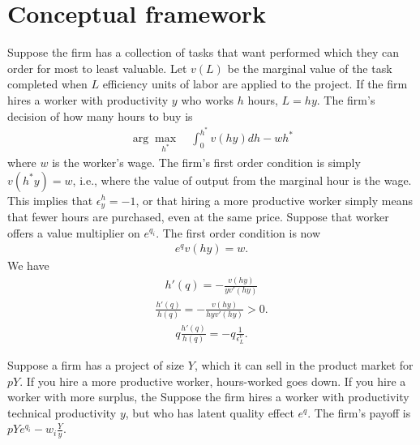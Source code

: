 \section{Conceptual framework} \label{sec:cf}

Suppose the firm has a collection of tasks that want performed which they can order for most to least valuable.
Let $v(L)$ be the marginal value of the task completed when $L$ efficiency units of labor are applied to the project.
If the firm hires a worker with productivity $y$ who works $h$ hours, $L = hy$.
The firm's decision of how many hours to buy is
\begin{align}
  \arg\max_{h^*} \quad \int_0^{h^*} v(hy) dh - wh^{*}  
\end{align} 
where $w$ is the worker's wage.
The firm's first order condition is simply $v(h^*y) = w$, i.e., where the value of output from the marginal hour is the wage.
This implies that $\epsilon^h_y = -1$, or that hiring a more productive worker simply means that fewer hours are purchased, even at the same price.
Suppose that worker offers a value multiplier on $e^{q_i}$.
The first order condition is now
\begin{align}
  e^{q} v(h y) = w.
\end{align} 
We have
\begin{align}
  h'(q) = - \frac{v(hy)}{y v'(hy)}
\end{align} 
\begin{align}
  \frac{h'(q)}{h(q)} = - \frac{v(hy)}{hy v'(hy)} > 0. 
\end{align}
\begin{align}
  q \frac{h'(q)}{h(q)} = - q \frac{1}{\epsilon^v_L}.
\end{align}



Suppose a firm has a project of size $Y$, which it can sell in the product market for $pY$.
If you hire a more productive worker, hours-worked goes down.
If you hire a worker with more surplus, the
Suppose the firm hires a worker with productivity technical productivity $y$, but who has latent quality effect $e^q$.
The firm's payoff is $pYe^{q_i} - w_i \frac{Y}{y}$.


